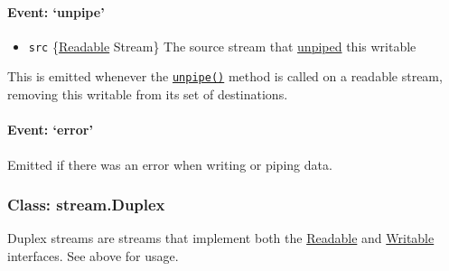 \paragraph{Event: `unpipe'}\label{event-unpipe}

\begin{itemize}
\itemsep1pt\parskip0pt
\item
  \texttt{src}
  \{\hyperref[streamux5fclassux5fstreamux5freadable]{Readable} Stream\}
  The source stream that
  \hyperref[streamux5freadableux5funpipeux5fdestination]{unpiped} this
  writable
\end{itemize}

This is emitted whenever the
\hyperref[streamux5freadableux5funpipeux5fdestination]{\texttt{unpipe()}}
method is called on a readable stream, removing this writable from its
set of destinations.

\begin{Shaded}
\begin{Highlighting}[]
 \NormalTok{();}
 \NormalTok{();}
\NormalTok{(}\NormalTok{, }
  \NormalTok{(}\NormalTok{);}
\NormalTok{\});}
\end{Highlighting}
\end{Shaded}

\paragraph{Event: `error'}\label{event-error-1}

Emitted if there was an error when writing or piping data.

\subsubsection{Class: stream.Duplex}\label{class-stream.duplex}

Duplex streams are streams that implement both the
\hyperref[streamux5fclassux5fstreamux5freadable]{Readable} and
\hyperref[streamux5fclassux5fstreamux5fwritable]{Writable} interfaces.
See above for usage.

